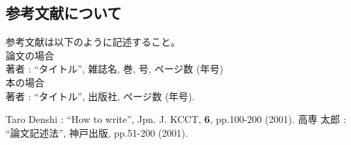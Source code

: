 \documentclass{jarticle}
\begin{document}
\subsection{参考文献について}
参考文献は以下のように記述すること。
\\
論文の場合\\
著者 : ``タイトル'', 雑誌名, 巻, 号, ページ数 (年号)\\
本の場合\\
著者 : ``タイトル'', 出版社, ページ数 (年号).\\

\begin{thebibliography}{99}%
Taro Denshi : ``How to write'', Jpn. J. KCCT,
 \textbf{6}, pp.100-200 (2001). 
高専 太郎 : ``論文記述法'', 神戸出版, pp.51-200 (2001). 
\end{thebibliography}
\end{document}
